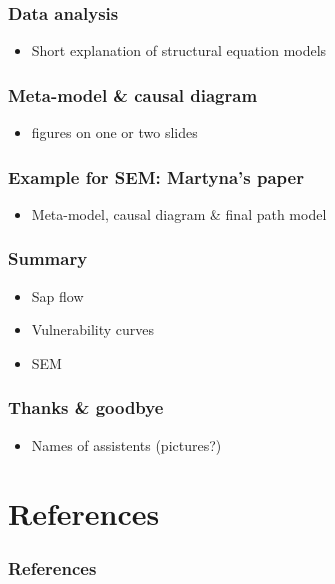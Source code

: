 \documentclass[usepdftitle=false]{beamer}
\begin{document}
\begin{frame}
	\frametitle{Data analysis}
	\begin{itemize}
		\item Short explanation of structural equation models		
	\end{itemize}
\end{frame}

\begin{frame}
	\frametitle{Meta-model \& causal diagram}
	\begin{itemize}
		\item figures on one or two slides		
	\end{itemize}
\end{frame}

\begin{frame}
	\frametitle{Example for SEM: Martyna's paper}
	\begin{itemize}
		\item Meta-model, causal diagram \& final path model	
	\end{itemize}
\end{frame}

\begin{frame}
	\frametitle{Summary}
	\begin{itemize}
		\item Sap flow
		\item Vulnerability curves
		\item SEM
	\end{itemize}
\end{frame}


\begin{frame}
	\frametitle{Thanks \& goodbye}
	\begin{itemize}
		\item Names of assistents (pictures?)
	\end{itemize}
\end{frame}

\section{References}
\begin{frame}
	\frametitle{References}
\end{frame}
\end{document}
